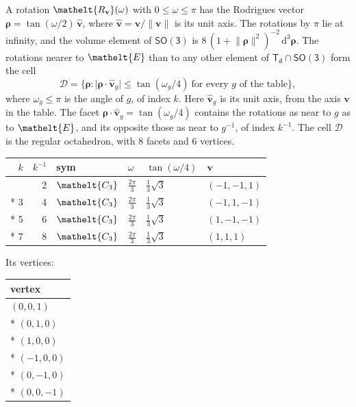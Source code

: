 \documentclass[10pt,a4paper]{article}
\numberwithin{equation}{section}
\newcommand{\eltfont}[1]{{\let\sigma\eltsigma\mathelt{#1}}}
\newcommand{\grp}[1]{\mathsf{#1}}
\newcommand{\cls}[1]{\eltfont{#1}}
\newcommand{\elt}[1]{\eltfont{#1}}
\newcommand{\dirvec}[3]{(#1, #2, #3)}
\newcommand{\unitaxis}{\hat{\mathbf{v}}}
\newcommand{\vv}{\mathbf{v}}
\newcommand{\diff}{\mathrm{d}}
\newcommand{\rodrigues}{\boldsymbol{\rho}}
\newcommand{\fcell}{\mathcal{D}}
\begin{document}
\leavevmode\label{n:vector.rodrigues}\label{n:vector.unitaxis}A rotation $\elt{R_{\vv}}(\omega)$ with $0 \le \omega \le \pi$ has the Rodrigues vector $\rodrigues = \tan(\omega/2)\,\unitaxis$, where $\unitaxis = \vv/\lVert\vv\rVert$ is its unit axis. The rotations by $\pi$ lie at infinity, and the volume element of \href{SO3.pdf}{$\grp{SO(3)}$} is $8\,(1 + \lVert\rodrigues\rVert^2)^{-2}\,\diff^3\rodrigues$.
\leavevmode\label{n:set.cell}The rotations nearer to $\elt{E}$ than to any other element of $\grp{T_{d}} \cap \grp{SO(3)}$ form the cell
\begin{equation}\label{e:cell}\fcell = \bigl\{\rodrigues : \lvert\rodrigues\cdot\unitaxis_g\rvert \le \tan(\omega_g/4)\ \text{for every $g$ of the table}\bigr\},\end{equation}
where $\omega_g \le \pi$ is the angle of $g$, of index $k$. Here $\unitaxis_g$ is its unit axis, from the axis $\vv$ in the table. The facet $\rodrigues\cdot\unitaxis_g = \tan(\omega_g/4)$ contains the rotations as near to $g$ as to $\elt{E}$, and its opposite those as near to $g^{-1}$, of index $k^{-1}$. The cell $\fcell$ is the regular octahedron, with 8 facets and 6 vertices.
{\small{\renewcommand{\arraystretch}{1.3}\begin{longtable}{@{}rrllll@{}}\toprule
$k$ & $k^{-1}$ & sym & $\omega$ & $\tan(\omega/4)$ & $\vv$\\\midrule\endhead
\bottomrule\endfoot\endlastfoot
1 & 2 & $\cls{C_{3}}$ & $\tfrac{2\pi}{3}$ & $\tfrac{1}{3}\sqrt{3}$ & $\dirvec{-1}{-1}{1}$\\*
3 & 4 & $\cls{C_{3}}$ & $\tfrac{2\pi}{3}$ & $\tfrac{1}{3}\sqrt{3}$ & $\dirvec{-1}{1}{-1}$\\*
5 & 6 & $\cls{C_{3}}$ & $\tfrac{2\pi}{3}$ & $\tfrac{1}{3}\sqrt{3}$ & $\dirvec{1}{-1}{-1}$\\*
7 & 8 & $\cls{C_{3}}$ & $\tfrac{2\pi}{3}$ & $\tfrac{1}{3}\sqrt{3}$ & $\dirvec{1}{1}{1}$\\
\bottomrule\end{longtable}}}
\leavevmode\label{n:head.vertex}Its vertices:
{\small\begin{longtable}{@{}l@{}}\toprule
vertex\\\midrule\endhead
\bottomrule\endfoot\endlastfoot
$(0, 0, 1)$\\*
$(0, 1, 0)$\\*
$(1, 0, 0)$\\*
$(-1, 0, 0)$\\*
$(0, -1, 0)$\\*
$(0, 0, -1)$\\
\bottomrule\end{longtable}}
\end{document}
